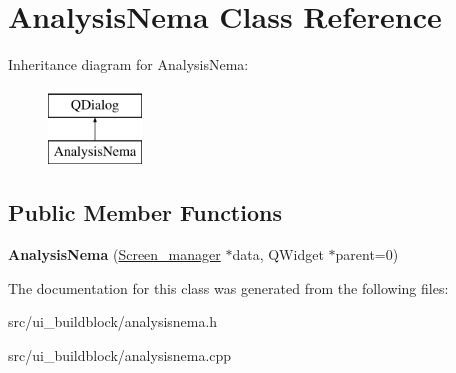 \hypertarget{classAnalysisNema}{}\section{Analysis\+Nema Class Reference}
\label{classAnalysisNema}
Inheritance diagram for Analysis\+Nema\+:\begin{figure}[H]
\begin{center}
\leavevmode
\includegraphics[height=2.000000cm]{classAnalysisNema}
\end{center}
\end{figure}
\subsection*{Public Member Functions}
\begin{DoxyCompactItemize}
\item 
\mbox{\label{classAnalysisNema_a22a539a883d51799e5983a40d59fabdf}} 
{\bfseries Analysis\+Nema} (\mbox{\hyperlink{classScreen__manager}{Screen\+\_\+manager}} $\ast$data, Q\+Widget $\ast$parent=0)
\end{DoxyCompactItemize}


The documentation for this class was generated from the following files\+:\begin{DoxyCompactItemize}
\item 
src/ui\+\_\+buildblock/analysisnema.\+h\item 
src/ui\+\_\+buildblock/analysisnema.\+cpp\end{DoxyCompactItemize}
